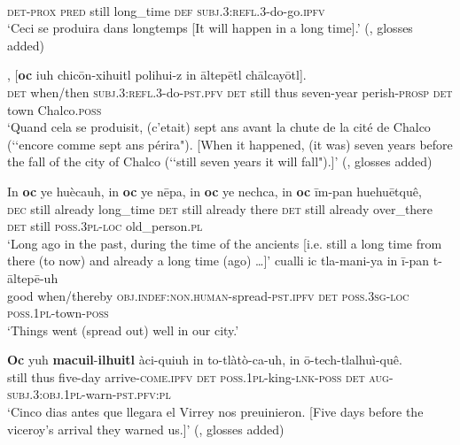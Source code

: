 \begin{exe}	
	\ex\label{exAppendixClassicalNahuatlTimeSpan1}
\\
\textsc{det}-\textsc{prox} \textsc{pred} still long\_time \textsc{def} \textsc{subj}.3:\textsc{refl}.3-do-go.\textsc{ipfv}\\
\glt \lq Ceci se produira dans longtemps [It will happen in a long time].' (\cite[1268]{Launey1986}, glosses added)

	\ex\label{exAppendixClassicalNahuatlTimeSpan2}
, [\textbf{oc} iuh chicōn-xihuitl polihui-z in āltepētl chālcayōtl].\\
\textsc{det} when/then \textsc{subj}.3:\textsc{refl}.3-do-\textsc{pst}.\textsc{pfv}  \textsc{det} still thus seven-year perish-\textsc{prosp} \textsc{det} town Chalco.\textsc{poss}\\
\glt \lq Quand cela se produisit, (c'etait) sept ans avant la chute de la cité de Chalco  (\lq\lq encore comme sept ans périra"). [When it happened, (it was) seven years before the fall of the city of Chalco (\lq\lq still seven years it will fall").]\rq{ }(\cite[400]{Launey1986}, glosses added)

	\ex\label{exAppendixClassicalNahuatlTimeSpan3}
	\gll In \textbf{oc} ye huècauh, in \textbf{oc} ye nēpa, in \textbf{oc} ye nechca, in \textbf{oc} īm-pan huehuētquê,\\
	\textsc{dec} still already long\_time \textsc{det} still already there \textsc{det} still already over\_there \textsc{det} still \textsc{poss}.3\textsc{pl}-\textsc{loc} old\_person.\textsc{pl}\\
	\glt\lq Long ago in the past, during the time of the ancients [i.e. still a long time from there (to now) and already a long time (ago) …]'
	\exi{} \gll cualli ic tla-mani-ya in ī-pan t-āltepē-uh\\
	good when/thereby \textsc{obj}.\textsc{indef}:\textsc{non}.\textsc{human}-spread-\textsc{pst}.\textsc{ipfv} \textsc{det} \textsc{poss}.3\textsc{sg}-\textsc{loc} \textsc{poss}.1\textsc{pl}-town-\textsc{poss}	\\
	\glt \lq Things went (spread out) well in our city.' \parencite[369]{LauneyMackay2011}

	\ex\label{exAppendixClassicalNahuatlTimeSpan4}
	\gll \textbf{Oc} yuh \textbf{macuil}-\textbf{ilhuitl} àci-quiuh in to-tlàtò-ca-uh, in ō-tech-tlalhuì-quê.\\
	still thus five-day arrive-\textsc{come}.\textsc{ipfv} \textsc{det} \textsc{poss}.1\textsc{pl}-king-\textsc{lnk}-\textsc{poss} \textsc{det}  \textsc{aug}-\textsc{subj}.3:\textsc{obj}.1\textsc{pl}-warn-\textsc{pst}.\textsc{pfv}:\textsc{pl}\\
	\glt \lq Cinco dias antes que llegara el Virrey nos preuinieron. [Five days before the viceroy’s arrival they warned us.]' (\cite[501]{Carochi1645}, glosses added)


\end{exe}
